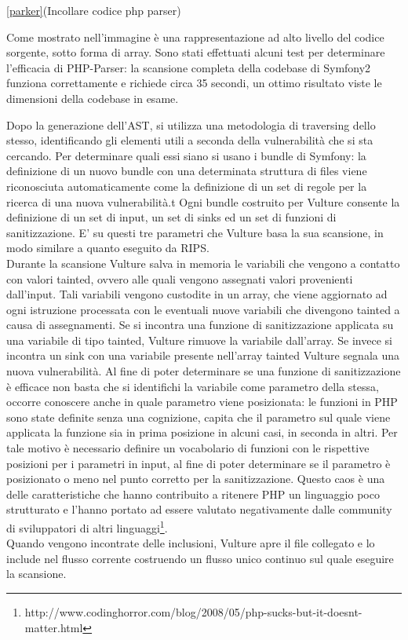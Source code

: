 \ref{parker}(Incollare codice php parser)

Come mostrato nell'immagine è una rappresentazione ad alto livello del codice sorgente, sotto forma di array. Sono stati effettuati alcuni test per determinare l'efficacia di PHP-Parser: la scansione completa della codebase di Symfony2 funziona correttamente e richiede circa 35 secondi, un ottimo risultato viste le dimensioni della codebase in esame.

Dopo la generazione dell'AST, si utilizza una metodologia di traversing dello stesso, identificando gli elementi utili a seconda della vulnerabilità che si sta cercando. Per determinare quali essi siano si usano i bundle di Symfony: la definizione di un nuovo bundle con una determinata struttura di files viene riconosciuta automaticamente come la definizione di un set di regole per la ricerca di una nuova vulnerabilità.t
Ogni bundle costruito per Vulture consente la definizione di un set di input, un set di sinks ed un set di funzioni di sanitizzazione. E' su questi tre parametri che Vulture basa la sua scansione, in modo similare a quanto eseguito da RIPS.\\
 
Durante la scansione Vulture salva in memoria le variabili che vengono a contatto con valori tainted, ovvero alle quali vengono assegnati valori provenienti dall'input. Tali variabili vengono custodite in un array, che viene aggiornato ad ogni istruzione processata con le eventuali nuove variabili che divengono tainted a causa di assegnamenti. Se si incontra una funzione di sanitizzazione applicata su una variabile di tipo tainted, Vulture rimuove la variabile dall'array. Se invece si incontra un sink con una variabile presente nell'array tainted Vulture segnala una nuova vulnerabilità. Al fine di poter determinare se una funzione di sanitizzazione è efficace non basta che si identifichi la variabile come parametro della stessa, occorre conoscere anche in quale parametro viene posizionata: le funzioni in PHP sono state definite senza una cognizione, capita che il parametro sul quale viene applicata la funzione sia in prima posizione in alcuni casi, in seconda in altri. Per tale motivo è necessario definire un vocabolario di funzioni con le rispettive posizioni per i parametri in input, al fine di poter determinare se il parametro è posizionato o meno nel punto corretto per la sanitizzazione. Questo caos è una delle caratteristiche che hanno contribuito a ritenere PHP un linguaggio poco strutturato e l'hanno portato ad essere valutato negativamente dalle community di sviluppatori di altri linguaggi\footnote{http://www.codinghorror.com/blog/2008/05/php-sucks-but-it-doesnt-matter.html}.\\
Quando vengono incontrate delle inclusioni, Vulture apre il file collegato e lo include nel flusso corrente costruendo un flusso unico continuo sul quale eseguire la scansione.

